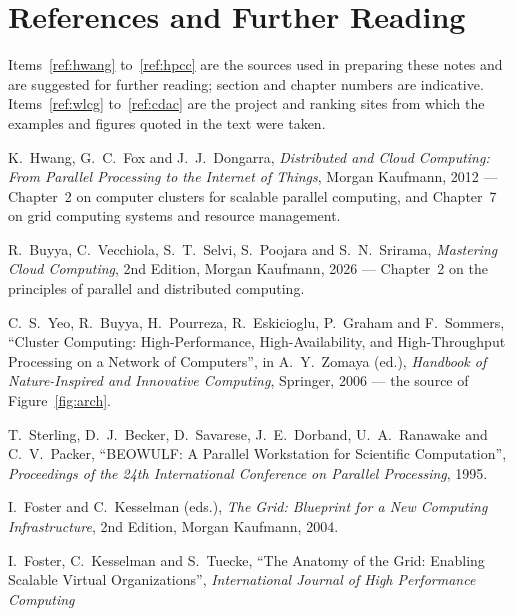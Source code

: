 \documentclass[../main.tex]{subfiles}
\begin{document}
\section{References and Further Reading}

Items~\ref{ref:hwang} to~\ref{ref:hpcc} are the sources used in preparing
these notes and are suggested for further reading; section and chapter
numbers are indicative. Items~\ref{ref:wlcg} to~\ref{ref:cdac} are the
project and ranking sites from which the examples and figures quoted in the
text were taken.

\begin{enumerate}[label={[\arabic*]},ref=\arabic*,leftmargin=2.2em]
  \item\label{ref:hwang} K.~Hwang, G.~C.~Fox and J.~J.~Dongarra,
        \textit{Distributed and Cloud Computing: From Parallel Processing to
        the Internet of Things}, Morgan Kaufmann, 2012 --- Chapter~2 on
        computer clusters for scalable parallel computing, and Chapter~7 on
        grid computing systems and resource management.
  \item\label{ref:buyya} R.~Buyya, C.~Vecchiola, S.~T.~Selvi, S.~Poojara and
        S.~N.~Srirama, \textit{Mastering Cloud Computing}, 2nd Edition,
        Morgan Kaufmann, 2026 --- Chapter~2 on the principles of parallel and
        distributed computing.
  \item\label{ref:yeo} C.~S.~Yeo, R.~Buyya, H.~Pourreza, R.~Eskicioglu,
        P.~Graham and F.~Sommers, ``Cluster Computing: High-Performance,
        High-Availability, and High-Throughput Processing on a Network of
        Computers'', in A.~Y.~Zomaya (ed.), \textit{Handbook of
        Nature-Inspired and Innovative Computing}, Springer, 2006 --- the
        source of Figure~\ref{fig:arch}.
  \item\label{ref:beowulf} T.~Sterling, D.~J.~Becker, D.~Savarese,
        J.~E.~Dorband, U.~A.~Ranawake and C.~V.~Packer, ``BEOWULF: A Parallel
        Workstation for Scientific Computation'', \textit{Proceedings of the
        24th International Conference on Parallel Processing}, 1995.
  \item\label{ref:blueprint} I.~Foster and C.~Kesselman (eds.), \textit{The
        Grid: Blueprint for a New Computing Infrastructure}, 2nd Edition,
        Morgan Kaufmann, 2004.
  \item\label{ref:anatomy} I.~Foster, C.~Kesselman and S.~Tuecke, ``The
        Anatomy of the Grid: Enabling Scalable Virtual Organizations'',
        \textit{International Journal of High Performance Computing
}
\end{enumerate}
\end{document}
